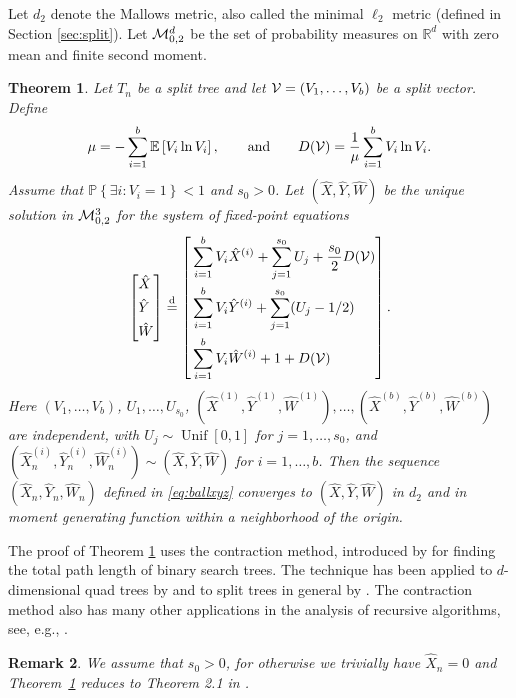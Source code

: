 \documentclass[11pt]{article}
\newcommand{\E}[1]{\mathbb{E} \left[#1\right]}
\newcommand{\mZeroIII}{\cM_{0,2}^{3}}
\newcommand{\mZeroD}{\cM_{0,2}^{d}}
\newcommand{\ball}[1]{\hat{#1}}
\def\bX{\ball{X}}
\def\bY{\ball{Y}}
\def\bW{\ball{W}}
\newcommand{\bVec}{(\bX, \bY, \bW)}
\newcommand{\bVecI}{\left(\bX_n^{(i)}, \bY_{n}^{(i)}, \bW_{n}^{(i)}\right)}
\newcommand{\bVecN}{(\bX_n, \bY_n, \bW_n)}
\newcommand\cM{{\cal M}}
\newcommand\cV{{\cal V}}
\def\R{\mathbb{R}}
\def\m{\mu}
\newcommand\Prob[1]{{\mathbb{P}\left\{#1\right\}}}
\newtheorem{theorem}{Theorem}
\numberwithin{theorem}{section}
\newtheorem{remark}[theorem]{Remark}
\theoremstyle{definition}
\newcommand{\dM}{d_2}
\newcommand{\eql}{\eqdd}%
\newcommand{\Unif}{\mathop{\mathrm{Unif}}}
\newcommand{\Toll}{D}
\numberwithin{equation}{section}
\newcommand{\refT}[1]{Theorem~\ref{#1}}
\newcommand\eqdd{\overset{\mathrm{d}}{=}}
\begin{document}
Let \(\dM\) denote the Mallows metric, also called the minimal $\ell_2$ metric (defined in Section
\ref{sec:split}).  Let \(\mZeroD\) be the set of probability measures on
\(\R^{d}\) with zero mean and finite 
second moment.

\begin{theorem}\label{thm:split}
Let \(T_n\) be a split tree and let $\cV = (V_1,\dots,V_b)$ be a split vector. Define
$$
\m = -\sum_{i=1}^b \E{V_i\ln V_i}, \qquad \text{and} \qquad \Toll(\cV) = \frac{1}{\m} \sum_{i=1}^b V_i\ln V_i.
$$
Assume that \(\Prob{\exists i:V_i = 1} < 1\) and \(s_{0} > 0\). 
Let $\bVec$ be the unique solution in \(\mZeroIII\) for the
system of
fixed-point equations
\begin{equation}
    \left[
    \begin{aligned}
        & \bX \\
        & \bY \\
        & \bW
    \end{aligned}
    \right]
    \eql
    \left[
    \begin{aligned}
        & \sum_{i=1}^b V_i \bX^{(i)} + \sum_{j=1}^{s_0} U_j + \frac{s_0}{2} \Toll(\cV)  \\
        & \sum_{i=1}^b V_i \bY^{(i)} + \sum_{j=1}^{s_0} (U_j-1/2) \\
        & \sum_{i=1}^b V_i \bW^{(i)} + 1 + \Toll(\cV)
    \end{aligned}
    \right]
    .
    \label{eq:Y}
\end{equation}
Here \( (V_{1},\dots,V_{b})\), \(U_{1},\dots,U_{s_{0}}\), 
\(
    (\bX^{(1)}, \bY^{(1)}, \bW^{(1)}),
    \dots,
    (\bX^{(b)}, \bY^{(b)}, \bW^{(b)})
\)
are independent,
with \(U_{j} \sim \Unif[0,1]\) for \(j=1,\dots,s_0\), and
\(\bVecI \sim \bVec\) for \(i = 1,\dots,b\).
Then the sequence $\bVecN$ defined in
\eqref{eq:ballxyz} converges to \(\bVec\) in \(\dM\) and in moment generating function within a
 neighborhood of the origin.
\end{theorem}

The proof of Theorem \ref{thm:split} uses the contraction method, introduced by \citet{MR1104413}
for finding the total path length of binary search trees. 
The technique has been applied to 
$d$-dimensional quad trees by \citet{nr99} and to split trees in general by \citet{MR3025680}.  The
contraction method also has many other applications in the analysis of recursive algorithms, see,
e.g., \cite{MR2023025, MR1887306, MR1887296}. 

\begin{remark}
    We assume that \(s_0 > 0\), for otherwise we trivially have \(\bX_{n} = 0\) and \refT{thm:split}
    reduces to Theorem 2.1 in \cite{MR3025680}.
    \label{rk:s:knot}
\end{remark}
\end{document}
